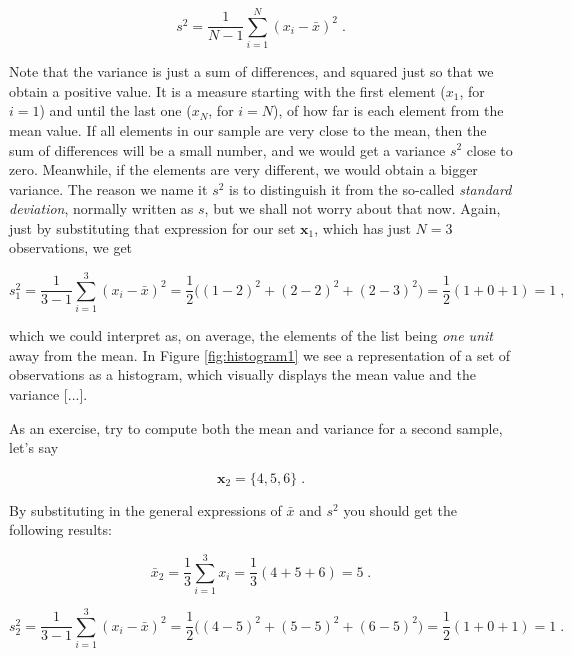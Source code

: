 \documentclass{book}
\begin{document}
\begin{equation}
	s^2 = \frac{1}{N - 1} \sum_{i = 1}^{N} (x_{i} - \bar{x})^{2} \; . 
\end{equation}

Note that the variance is just a sum of differences, and squared just so that we obtain a positive value. It is a measure starting with the first element ($x_1$, for $i = 1$) and until the last one ($x_N$, for $i = N$), of how far is each element from the mean value. If all elements in our sample are very close to the mean, then the sum of differences will be a small number, and we would get a variance $s^2$ close to zero. Meanwhile, if the elements are very different, we would obtain a bigger variance. The reason we name it $s^2$ is to distinguish it from the so-called \textit{standard deviation}, normally written as $s$, but we shall not worry about that now. Again, just by substituting that expression for our set $\textbf{x}_1$, which has just $N = 3$ observations, we get

\begin{equation}
	s_1^2 = \frac{1}{3 - 1} \sum_{i = 1}^{3} (x_{i} - \bar{x})^{2} = \frac{1}{2} \big((1 - 2)^{2} + (2 - 2)^{2} + (2 - 3)^{2}\big) = \frac{1}{2} (1 + 0 + 1) = 1 \; , \nonumber
\end{equation}

which we could interpret as, on average, the elements of the list being \textit{one unit} away from the mean. In Figure \ref{fig:histogram1} we see a representation of a set of observations as a histogram, which visually displays the mean value and the variance [...].

\medskip

As an exercise, try to compute both the mean and variance for a second sample, let's say

\begin{equation}
	\textbf{x}_2 = \{4, 5, 6\} \; . \nonumber
\end{equation}

By substituting in the general expressions of $\bar{x}$ and $s^2$ you should get the following results: 

\begin{equation}
	\bar{x}_2 = \frac{1}{3} \sum_{i = 1}^{3} x_{i} = \frac{1}{3} (4 + 5 + 6) = 5 \; . \nonumber
\end{equation}

\begin{equation}
	s^2_2 = \frac{1}{3 - 1} \sum_{i = 1}^{3} (x_{i} - \bar{x})^{2} = \frac{1}{2} \big((4 - 5)^{2} + (5 - 5)^{2} + (6 - 5)^{2}\big) = \frac{1}{2} (1 + 0 + 1) = 1 \; . \nonumber
\end{equation}
\end{document}
